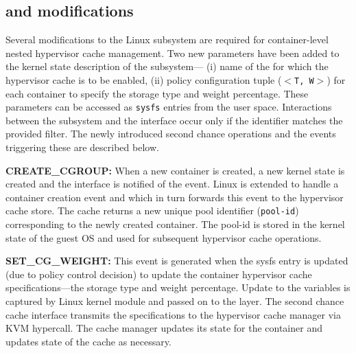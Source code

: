 \subsection{\cgroup{} and \cleancache{} modifications}
%
Several modifications to the Linux \cgroups{} subsystem
are required for container-level nested hypervisor cache management.
%
Two new parameters have been added to the kernel
state description of the \cgroups{} subsystem---
(i) name of the \cgroups{} for
which the hypervisor cache is to be enabled, 
(ii) policy configuration tuple ($<$\texttt{T, W}$>$) for each container 
to specify 
the storage type and weight percentage.
%
These parameters can be accessed as \texttt{sysfs} entries 
from the user space.
%
Interactions between the \cgroup{} subsystem and the \cleancache{} interface
occur only if the \cgroup{} identifier matches the provided filter.
%
The newly introduced second chance operations and the events triggering these 
are described below.
%

\vspace{0.15cm}
\noindent
{\bf CREATE\_CGROUP:} When a new container is created, a new \cgroup{}
kernel state is created and
the \cleancache{} interface is notified of the event.
%
Linux \cleancache{} is extended to handle a container creation event and 
which in turn forwards this event to the \dd{} hypervisor cache store.
%
The \dd{} cache returns a new unique pool identifier (\texttt{pool-id}) 
corresponding to the newly created container. 
%
The pool-id is stored
in the \cgroup{} kernel state of the guest OS and used for subsequent
hypervisor cache operations.
%

\vspace{0.15cm}
\noindent
{\bf SET\_CG\_WEIGHT:} 
%
This event is generated when the \cgroup{} sysfs entry is updated 
(due to policy control decision) to update the container hypervisor
cache specifications---the storage type and weight percentage.
%
Update to the \cgroup{} variables is captured by Linux 
kernel \cgroup{} module and passed on to the \cleancache{} layer. 
%
The \cleancache{} second chance cache interface transmits the specifications
to the \dd{} hypervisor cache manager via KVM hypercall. 
The \dd{} cache manager updates its state for the container
and updates state of the cache as necessary.
%
 
